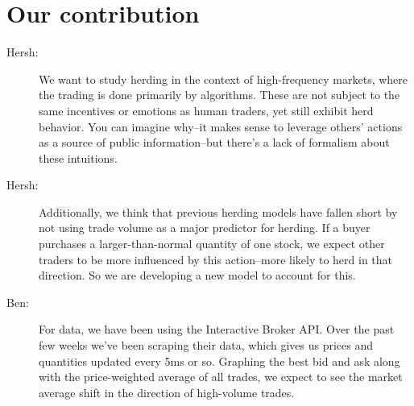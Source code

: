 \documentclass[11pt]{article}
\begin{document}
\section{Our contribution}
\label{sec-3}
\begin{description}
  \item[Hersh:] We want to study herding in the context of high-frequency markets, where the trading is done primarily by algorithms.
         These are not subject to the same incentives or emotions as human traders, yet still exhibit herd behavior.
         You can imagine why--it makes sense to leverage others' actions as a source of public information--but there's a lack of formalism about these intuitions.
  \item[Hersh:] Additionally, we think that previous herding models have fallen short by not using trade volume as a major predictor for herding.
         If a buyer purchases a larger-than-normal quantity of one stock, we expect other traders to be more influenced by this action--more likely to herd in that direction.
         So we are developing a new model to account for this.
  \item[Ben:] For data, we have been using the Interactive Broker API. 
       Over the past few weeks we've been scraping their data, which gives us prices and quantities updated every 5ms or so.
       Graphing the best bid and ask along with the price-weighted average of all trades, we expect to see the market average shift in the direction of high-volume trades.
\end{description}
\end{document}
